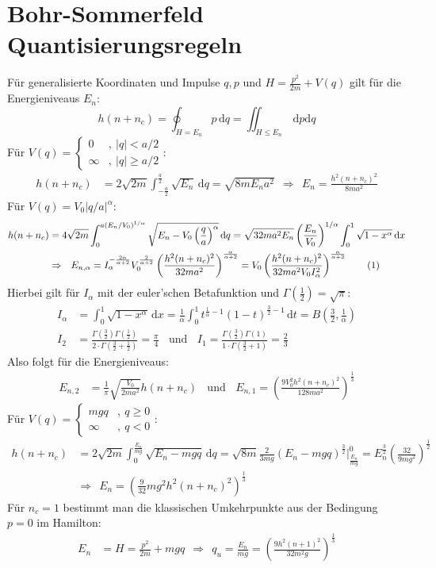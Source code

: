 \documentclass[a4paper,12pt]{article}
\newcommand\numberthis{\addtocounter{equation}{1}\tag{\theequation}}
\begin{document}
\section{Bohr-Sommerfeld Quantisierungsregeln}
Für generalisierte Koordinaten und Impulse $q, p$ und $H=\frac{p^2}{2m}+V(q)$ gilt für die Energieniveaus $E_n$:
$$h(n+n_c)=\oint_{H=E_n}p\,\mathrm{d}q=\iint_{H\le E_n}\,\mathrm{d}p\mathrm{d}q$$
Für $V(q)=\left\{\begin{matrix}
0 &,\ |q|<a/2 \\ \infty &,\ |q|\ge a/2 
\end{matrix}\right .$:
\begin{align*}
h(n+n_c)&=2\sqrt{2m}\int_{-\frac{a}{2}}^{\frac{a}{2}}\sqrt{E_n}\,\mathrm{d}q=\sqrt{8mE_na^2}\ \ \Rightarrow\ \ E_n=\frac{h^2(n+n_c)^2}{8ma^2}
\end{align*}
Für $V(q)=V_0|q/a|^\alpha$:
\begin{align*}
h(n+n_c)&=4\sqrt{2m}\int_0^{a(E_n/V_0)^{1/\alpha}}\sqrt{E_n-V_0\left(\frac{q}{a}\right)^\alpha}\,\mathrm{d}q=\sqrt{32ma^2E_n}\left(\frac{E_n}{V_0}\right)^{1/\alpha}\int_0^1\sqrt{1-x^\alpha}\,\mathrm{d}x \\
&\Rightarrow\ \ E_{n,\alpha}=I_\alpha^{-\frac{2\alpha}{\alpha +2}}V_0^\frac{2}{\alpha +2}\left(\frac{h^2(n+n_c)^2}{32ma^2}\right)^\frac{\alpha}{\alpha +2}=V_0\left(\frac{h^2(n+n_c)^2}{32ma^2V_0I_\alpha^2}\right)^\frac{\alpha}{\alpha +2} \label{E_n_alpha}\numberthis
\end{align*}
Hierbei gilt für $I_\alpha$ mit der euler'schen Betafunktion und $\Gamma(\frac{1}{2})=\sqrt{\pi}$:
\begin{align*}
I_\alpha &=\int_0^1\sqrt{1-x^\alpha}\,\mathrm{d}x=\frac{1}{\alpha}\int_0^1t^{\frac{1}{\alpha}-1}(1-t)^{\frac{3}{2}-1}\,\mathrm{d}t=B\left(\frac{3}{2},\frac{1}{\alpha}\right)\\
I_2&=\frac{\Gamma(\frac{3}{2})\Gamma(\frac{1}{2})}{2\cdot\Gamma(\frac{3}{2}+\frac{1}{2})}=\frac{\pi}{4}\ \ \ \ \mathrm{und }\ \ \ \ I_1=\frac{\Gamma(\frac{3}{2})\Gamma(1)}{1\cdot\Gamma(\frac{3}{2}+1)}=\frac{2}{3}
\end{align*}
Also folgt für die Energieniveaus:
\begin{align*}
E_{n, 2}&=\frac{1}{\pi}\sqrt{\frac{V_0}{2ma^2}}h(n+n_c)\ \ \ \ \mathrm{und }\ \ \ \ E_{n, 1}=\left(\frac{9V_0^2h^2(n+n_c)^2}{128ma^2}\right)^\frac{1}{3}
\end{align*}
Für $V(q)=\left\{\begin{matrix}
mgq &,\ q\ge 0 \\ \infty &,\ q<0 
\end{matrix}\right .$:
\begin{align*}
h(n+n_c)&=2\sqrt{2m}\int_{0}^{\frac{E_n}{mg}}\sqrt{E_n-mgq}\,\mathrm{d}q=\sqrt{8m}\frac{2}{3mg}(E_n-mgq)^\frac{3}{2}\bigg\vert_{\frac{E_n}{mg}}^0=E_n^\frac{3}{2}\left(\frac{32}{9mg^2}\right)^\frac{1}{2}\\
&\Rightarrow\ \ E_n=\left(\frac{9}{32}mg^2h^2(n+n_c)^2\right)^\frac{1}{3}
\end{align*}
Für $n_c=1$ bestimmt man die klassischen Umkehrpunkte aus der Bedingung $p=0$ im Hamilton:
\begin{align*}
E_n&=H=\frac{p^2}{2m}+mgq\ \ \Rightarrow\ \ q_u=\frac{E_n}{mg}=\left(\frac{9h^2(n+1)^2}{32m^2g}\right)^\frac{1}{3}
\end{align*}
\end{document}
